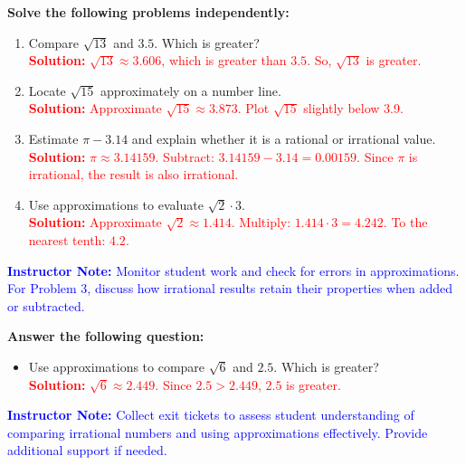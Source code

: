 \documentclass[12pt]{article}
\begin{document}
\begin{tcolorbox}[colframe=black!60, colback=white, 
coltitle=black, colbacktitle=black!15, fonttitle=\bfseries\Large, 
title=Independent Practice, halign title=center, left=10pt, right=10pt, top=10pt, bottom=15pt]
\textbf{Solve the following problems independently:}
\begin{enumerate}[itemsep=3em]
    \item Compare \( \sqrt{13} \) and \( 3.5 \). Which is greater?\\
    \textcolor{red}{\textbf{Solution:} \( \sqrt{13} \approx 3.606 \), which is greater than \( 3.5 \). So, \( \sqrt{13} \) is greater.}

    \item Locate \( \sqrt{15} \) approximately on a number line.\\
    \textcolor{red}{\textbf{Solution:} Approximate \( \sqrt{15} \approx 3.873 \). Plot \( \sqrt{15} \) slightly below 3.9.}

    \item Estimate \( \pi - 3.14 \) and explain whether it is a rational or irrational value.\\
    \textcolor{red}{\textbf{Solution:} \( \pi \approx 3.14159 \). Subtract: \( 3.14159 - 3.14 = 0.00159 \). Since \( \pi \) is irrational, the result is also irrational.}

    \item Use approximations to evaluate \( \sqrt{2} \cdot 3 \).\\
    \textcolor{red}{\textbf{Solution:} Approximate \( \sqrt{2} \approx 1.414 \). Multiply: \( 1.414 \cdot 3 = 4.242 \). To the nearest tenth: \( 4.2 \).}
\end{enumerate}

\textcolor{blue}{\textbf{Instructor Note:}} \textcolor{blue}{Monitor student work and check for errors in approximations. For Problem 3, discuss how irrational results retain their properties when added or subtracted.}
\end{tcolorbox}

\begin{tcolorbox}[colframe=black!60, colback=white, 
coltitle=black, colbacktitle=black!15, fonttitle=\bfseries\Large, 
title=Exit Ticket, halign title=center, left=10pt, right=10pt, top=10pt, bottom=15pt]
\textbf{Answer the following question:}
\begin{itemize}
    \item Use approximations to compare \( \sqrt{6} \) and \( 2.5 \). Which is greater?\\
    \textcolor{red}{\textbf{Solution:} \( \sqrt{6} \approx 2.449 \). Since \( 2.5 > 2.449 \), \( 2.5 \) is greater.}
\end{itemize}

\textcolor{blue}{\textbf{Instructor Note:}} \textcolor{blue}{Collect exit tickets to assess student understanding of comparing irrational numbers and using approximations effectively. Provide additional support if needed.}
\end{tcolorbox}
\end{document}
